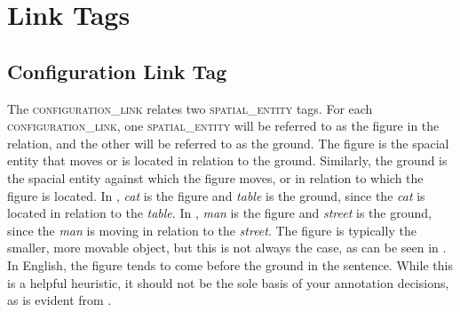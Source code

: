 \documentclass[11pt]{article}
\begin{document}



\section{Link Tags} %
\label{sec:link_tags}

\subsection{Configuration Link Tag} %
\label{sub:configuration_link}
The \textsc{configuration\_link} relates two \textsc{spatial\_entity} tags. For each \textsc{configuration\_link}, one \textsc{spatial\_entity} will be referred to as the figure in the relation, and the other will be referred to as the ground. The figure is the spacial entity that moves or is located in relation to the ground. Similarly, the ground is the spacial entity against which the figure moves, or in relation to which the figure is located. In , \emph{cat} is the figure and \emph{table} is the ground, since the \emph{cat} is located in relation to the \emph{table}. In , \emph{man} is the figure and \emph{street} is the ground, since the \emph{man} is moving in relation to the \emph{street}. The figure is typically the smaller, more movable object, but this is not always the case, as can be seen in . In English, the figure tends to come before the ground in the sentence. While this is a helpful heuristic, it should not be the sole basis of your annotation decisions, as is evident from .
 

\label{ex:fig_ground_examples}
\end{document}

